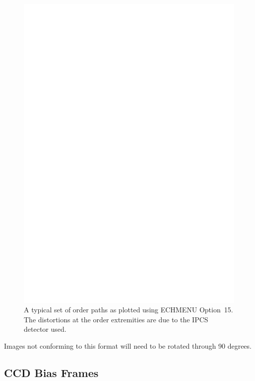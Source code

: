 \documentclass[11pt,twoside]{article}
\newcommand{\xlabel}[1]{}
\newcommand{\mlabel}[1]{\xlabel{#1}\label{#1}}
\newcommand{\sunspec}[2]{#1}
\renewcommand{\sunspec}[2]{#2}
\newcommand{\myindex}[1]{\index{#1}}
\renewcommand{\myindex}[1]{}
\begin{document}
\begin{htmlonly}
\begin{figure}
\begin{center}
\includegraphics[width=\textwidth]{sun152_cover.eps}

\parbox{140mm}{
\caption{A typical set of order paths as plotted using ECHMENU Option~15.
The distortions at the order extremities are due to the IPCS detector used.}
\label{fi_order2}
}
\end{center}
\end{figure}
\end{htmlonly}

Images not conforming to this format will need to be rotated through 90
degrees.

\subsection{\mlabel{CCD_bias_frames}CCD Bias Frames}
\myindex{CCD!bias}
\end{document}
